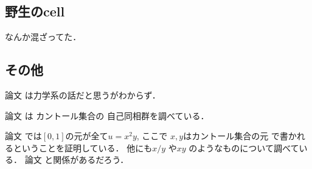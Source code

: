 \documentclass[leqno, a4paper, 12pt]{jsarticle}
\begin{document}
\cite{MR0375323}

\cite{MR3303046}

\cite{MR0896874}

\cite{MR0234438}


\cite{MR0580587}


\cite{MR0221487}

\subsection{野生のcell}
なんか混ざってた．

\cite{MR0027512}

\cite{MR0178460}


\subsection{その他}
論文
\cite{MR3397281}
は力学系の話だと思うがわからず．

論文
\cite{MR2291714}
は
カントール集合の
自己同相群を調べている．

論文
\cite{MR3904605}
では$[0, 1]$の元が全て$u=x^{2}y$, ここで
$x, y$はカントール集合の元
で書かれるということを証明している．
他にも$x/y$
や$xy$
のようなものについて調べている．
論文
\cite{MR4487615}
と関係があるだろう．

\nocite{*}


\end{document}

